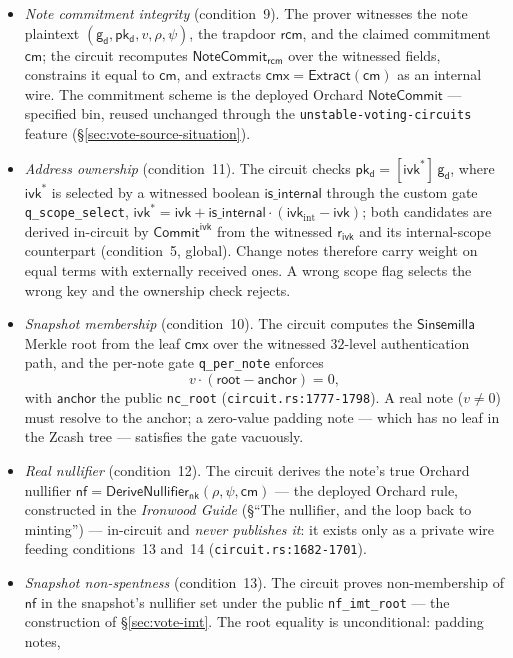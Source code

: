 \documentclass[11pt,a4paper]{article}
\theoremstyle{definition}
\newcommand{\nfsym}{\mathsf{nf}}
\newcommand{\cmsym}{\mathsf{cm}}
\newcommand{\cmx}{\mathsf{cmx}}
\newcommand{\NoteCommit}{\ensuremath{\mathsf{NoteCommit}}}
\newcommand{\Sinsemilla}{\ensuremath{\mathsf{Sinsemilla}}}
\newcommand{\CommitIvk}{\ensuremath{\mathsf{Commit}^{\mathsf{ivk}}}}
\newcommand{\Extract}{\ensuremath{\mathsf{Extract}}}
\newcommand{\nksym}{\ensuremath{\mathsf{nk}}}
\newcommand{\ivk}{\ensuremath{\mathsf{ivk}}}
\newcommand{\pkd}{\ensuremath{\mathsf{pk_d}}}
\newcommand{\gd}{\ensuremath{\mathsf{g_d}}}
\newcommand{\rcm}{\ensuremath{\mathsf{rcm}}}
\newcommand{\rivk}{\ensuremath{\mathsf{r_{ivk}}}}
\begin{document}
\begin{itemize}
\item \emph{Note commitment integrity} (condition~9). The prover witnesses
  the note plaintext $(\gd, \pkd, v, \rho, \psi)$, the trapdoor $\rcm$, and
  the claimed commitment $\cmsym$; the circuit recomputes
  $\NoteCommit_{\rcm}$ over the witnessed fields, constrains it equal to
  $\cmsym$, and extracts $\cmx = \Extract(\cmsym)$ as an internal wire. The
  commitment scheme is the deployed Orchard \NoteCommit{} --- specified
  bin, reused unchanged through the \texttt{unstable-voting-circuits}
  feature (\S\ref{sec:vote-source-situation}).
\item \emph{Address ownership} (condition~11). The circuit checks
  $\pkd = [\ivk^{*}]\,\gd$, where $\ivk^{*}$ is selected by a witnessed
  boolean $\mathsf{is\_internal}$ through the custom gate
  \texttt{q\_scope\_select},
  $\ivk^{*} = \ivk + \mathsf{is\_internal}\cdot(\ivk_{\mathrm{int}} - \ivk)$;
  both candidates are derived in-circuit by \CommitIvk{} from the witnessed
  $\rivk$ and its internal-scope counterpart (condition~5, global). Change
  notes therefore carry weight on equal terms with externally received
  ones. A wrong scope flag selects the wrong key and the ownership check
  rejects.
\item \emph{Snapshot membership} (condition~10). The circuit computes the
  \Sinsemilla{} Merkle root from the leaf $\cmx$ over the witnessed
  $32$-level authentication path, and the per-note gate
  \texttt{q\_per\_note} enforces
  \[
    v \cdot (\mathsf{root} - \mathsf{anchor}) = 0,
  \]
  with $\mathsf{anchor}$ the public \texttt{nc\_root}
  (\texttt{circuit.rs:1777-1798}). A real note ($v \neq 0$) must resolve to
  the anchor; a zero-value padding note --- which has no leaf in the Zcash
  tree --- satisfies the gate vacuously.
\item \emph{Real nullifier} (condition~12). The circuit derives the note's
  true Orchard nullifier
  $\nfsym = \mathsf{DeriveNullifier}_{\nksym}(\rho, \psi, \cmsym)$ --- the
  deployed Orchard rule, constructed in the \emph{Ironwood Guide}
  (\S``The nullifier, and the loop back to minting'') --- in-circuit and
  \emph{never publishes it}: it exists only as a private wire feeding
  conditions~13 and~14 (\texttt{circuit.rs:1682-1701}).
\item \emph{Snapshot non-spentness} (condition~13). The circuit proves
  non-membership of $\nfsym$ in the snapshot's nullifier set under the
  public \texttt{nf\_imt\_root} --- the construction of
  \S\ref{sec:vote-imt}. The root equality is unconditional: padding notes,

\end{itemize}
\end{document}
